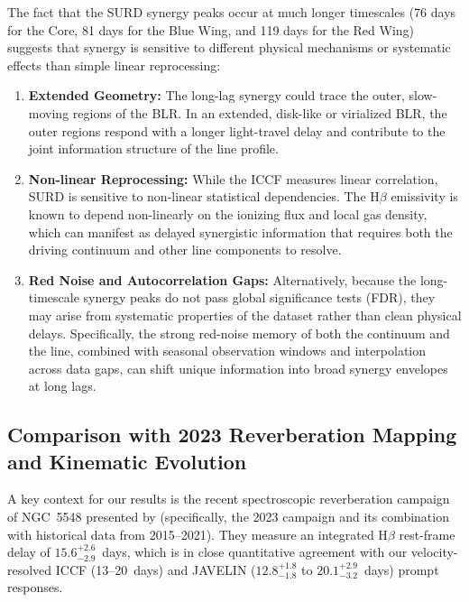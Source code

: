 \documentclass[12pt, a4paper]{article}
\begin{document}
The fact that the SURD synergy peaks occur at much longer timescales (76 days for the Core, 81 days for the Blue Wing, and 119 days for the Red Wing) suggests that synergy is sensitive to different physical mechanisms or systematic effects than simple linear reprocessing:
\begin{enumerate}
\item \textbf{Extended Geometry:} The long-lag synergy could trace the outer, slow-moving regions of the BLR. In an extended, disk-like or virialized BLR, the outer regions respond with a longer light-travel delay and contribute to the joint information structure of the line profile.
\item \textbf{Non-linear Reprocessing:} While the ICCF measures linear correlation, SURD is sensitive to non-linear statistical dependencies. The H\(\beta\) emissivity is known to depend non-linearly on the ionizing flux and local gas density, which can manifest as delayed synergistic information that requires both the driving continuum and other line components to resolve.
\item \textbf{Red Noise and Autocorrelation Gaps:} Alternatively, because the long-timescale synergy peaks do not pass global significance tests (FDR), they may arise from systematic properties of the dataset rather than clean physical delays. Specifically, the strong red-noise memory of both the continuum and the line, combined with seasonal observation windows and interpolation across data gaps, can shift unique information into broad synergy envelopes at long lags.
\end{enumerate}

\subsection{Comparison with 2023 Reverberation Mapping and Kinematic Evolution}
\label{sec:comparison_xi}

A key context for our results is the recent spectroscopic reverberation campaign of NGC~5548 presented by \textcite{LongDexter2025} (specifically, the 2023 campaign and its combination with historical data from 2015--2021). They measure an integrated H\(\beta\) rest-frame delay of \(15.6_{-2.9}^{+2.6}\)~days, which is in close quantitative agreement with our velocity-resolved ICCF (13--20~days) and JAVELIN (\(12.8_{-1.8}^{+1.8}\) to \(20.1_{-3.2}^{+2.9}\)~days) prompt responses. 
\end{document}
